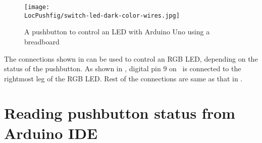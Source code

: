 \begin{figure}
  \centering
  \texttt{[image: \\LocPushfig/switch-led-dark-color-wires.jpg]}
  \caption{A pushbutton to control an LED with Arduino Uno using a breadboard}
  \label{fig:switch-led}
\end{figure}
The connections shown in  can be used to control an RGB LED, 
depending on the status of the pushbutton. As shown in , digital
pin 9 on \arduino\ is connected to the rightmost leg of the RGB LED. Rest of the connections
are same as that in . 

\section{Reading pushbutton status from Arduino IDE}
